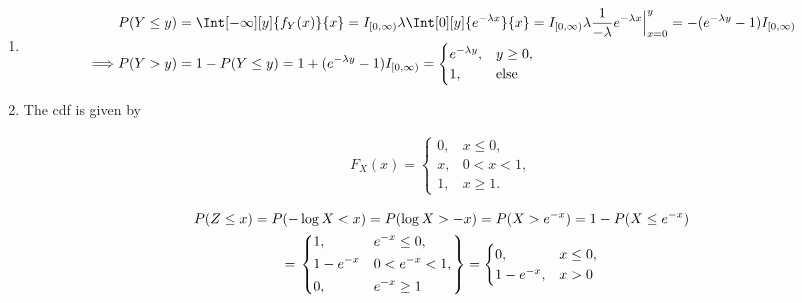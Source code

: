 \begin{solution}

\phantom{}

\begin{enumerate}[label = (\alph*)]

    \item

    \begin{align*}
        &
        P(Y \leq y)
        =
        \Int[-\infty][y]{f_Y(x)}{x}
        =
        I_{[0, \infty)} \lambda \Int[0][y]{e^{-\lambda x}}{x}
        =
        I_{[0, \infty)} \lambda \frac{1}{-\lambda} e^{-\lambda x} \Big |_{x=0}^y
        =
        -(e^{-\lambda y} - 1) I_{[0, \infty)} \\
        \implies &
        P(Y > y)
        =
        1 - P(Y \leq y)
        =
        1 + (e^{-\lambda y} - 1) I_{[0, \infty)}
        =
        \begin{cases}
            e^{-\lambda y}, & y \geq 0, \\
            1,              & \text{else}
        \end{cases}
    \end{align*}

    \item The cdf is given by
    
    \begin{align*}
        F_X(x)
        =
        \begin{cases}
            0, & x \leq 0,  \\
            x, & 0 < x < 1, \\
            1, & x \geq 1.
        \end{cases}
    \end{align*}

    \begin{multline*}
        P(Z \leq x)
        =
        P(-\log X < x)
        =
        P(\log X > -x)
        =
        P(X > e^{-x})
        =
        1 - P(X \leq e^{-x}) \\
        =
        \begin{rcases}
            \begin{dcases}
                1,         & e^{-x} \leq 0, \\
                1 - e^{-x} & 0 < e^{-x} < 1, \\
                0,         & e^{-x} \geq 1                
            \end{dcases}
        \end{rcases}
        =
        \begin{cases}
            0,          & x \leq 0, \\
            1 - e^{-x}, & x > 0
        \end{cases}
    \end{multline*}

\end{enumerate}

\end{solution}

